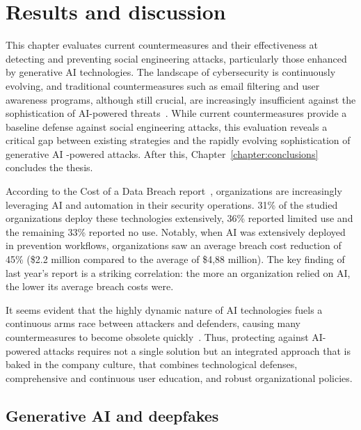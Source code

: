 
\chapter{Results and discussion\label{chapter:discussion}}
\begin{comment}
\end{comment}

This chapter evaluates current countermeasures and their effectiveness at detecting and preventing social engineering attacks, particularly those enhanced by generative AI technologies. The landscape of cybersecurity is continuously evolving, and traditional countermeasures such as email filtering and user awareness programs, although still crucial, are increasingly insufficient against the sophistication of AI-powered threats~\citep{fakhouri_AI_Driven_Solutions_SE_Attacks_2024}. While current countermeasures provide a baseline defense against social engineering attacks, this evaluation reveals a critical gap between existing strategies and the rapidly evolving sophistication of generative AI -powered attacks. After this, Chapter~\ref{chapter:conclusions} concludes the thesis.

According to the Cost of a Data Breach report~\citep{ibm_Cost_Data_Breach_Report_2024}, organizations are increasingly leveraging AI and automation in their security operations. 31\% of the studied organizations deploy these technologies extensively, 36\% reported limited use and the remaining 33\% reported no use. Notably, when AI was extensively deployed in prevention workflows, organizations saw an average breach cost reduction of 45\% (\$2.2 million compared to the average of \$4,88 million). The key finding of last year's report is a striking correlation: the more an organization relied on AI, the lower its average breach costs were.

It seems evident that the highly dynamic nature of AI technologies fuels a continuous arms race between attackers and defenders, causing many countermeasures to become obsolete quickly~\citep{fakhouri_AI_Driven_Solutions_SE_Attacks_2024}. Thus, protecting against AI-powered attacks requires not a single solution but an integrated approach that is baked in the company culture, that combines technological defenses, comprehensive and continuous user education, and robust organizational policies.

\section{Generative AI and deepfakes}
\begin{comment}
\end{comment}

